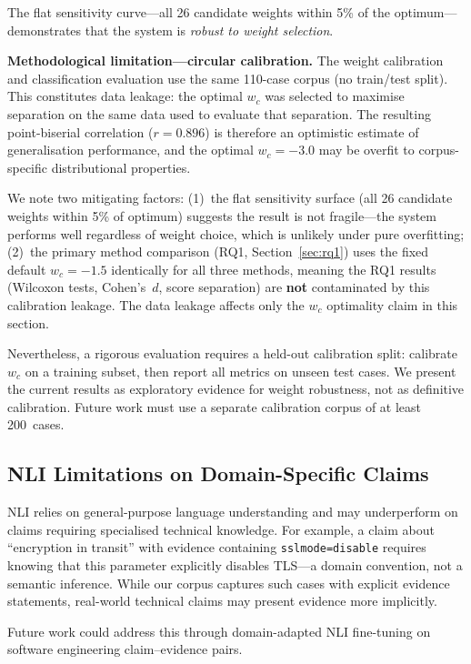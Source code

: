 \documentclass[11pt,a4paper]{article}
\begin{document}
The flat sensitivity curve---all 26 candidate weights within 5\% of
the optimum---demonstrates that the system is \emph{robust to weight
selection}.

\textbf{Methodological limitation---circular calibration.}  The
weight calibration and classification evaluation use the same
110-case corpus (no train/test split).  This constitutes data
leakage: the optimal $w_c$ was selected to maximise separation on the
same data used to evaluate that separation.  The resulting
point-biserial correlation ($r = 0.896$) is therefore an optimistic
estimate of generalisation performance, and the optimal
$w_c = -3.0$ may be overfit to corpus-specific distributional
properties.

We note two mitigating factors: (1)~the flat sensitivity surface
(all 26 candidate weights within 5\% of optimum) suggests the result
is not fragile---the system performs well regardless of weight
choice, which is unlikely under pure overfitting; (2)~the primary
method comparison (RQ1, Section~\ref{sec:rq1}) uses the fixed
default $w_c = -1.5$ identically for all three methods, meaning the
RQ1 results (Wilcoxon tests, Cohen's~$d$, score separation) are
\textbf{not} contaminated by this calibration leakage.  The data
leakage affects only the $w_c$ optimality claim in this section.

Nevertheless, a rigorous evaluation requires a held-out calibration
split: calibrate $w_c$ on a training subset, then report all metrics
on unseen test cases.  We present the current results as exploratory
evidence for weight robustness, not as definitive calibration.
Future work must use a separate calibration corpus of at
least 200~cases.

\subsection{NLI Limitations on Domain-Specific Claims}

NLI relies on general-purpose language understanding and may
underperform on claims requiring specialised technical knowledge.
For example, a claim about ``encryption in transit'' with evidence
containing \texttt{sslmode=disable} requires knowing that this
parameter explicitly disables TLS---a domain convention, not a
semantic inference.  While our corpus captures such cases with
explicit evidence statements, real-world technical claims may present
evidence more implicitly.

Future work could address this through domain-adapted NLI fine-tuning
on software engineering claim--evidence pairs.
\end{document}
